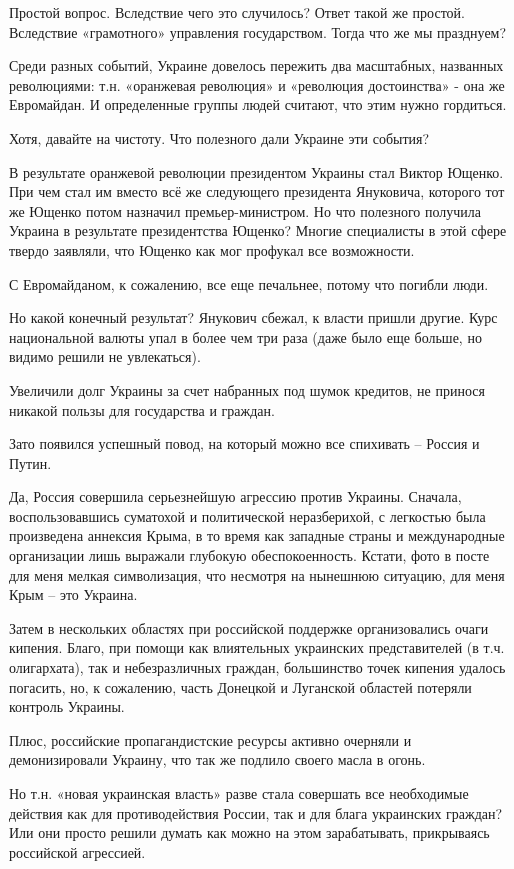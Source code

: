 Простой вопрос. Вследствие чего это случилось? Ответ такой же простой.
Вследствие «грамотного» управления государством. Тогда что же мы празднуем?

Среди разных событий, Украине довелось пережить два масштабных, названных
революциями: т.н. «оранжевая революция» и «революция достоинства» - она же
Евромайдан. И определенные группы людей считают, что этим нужно гордиться.

Хотя, давайте на чистоту. Что полезного дали Украине эти события?

В результате оранжевой революции президентом Украины стал Виктор Ющенко. При
чем стал им вместо всё же следующего президента Януковича, которого тот же
Ющенко потом назначил премьер-министром. Но что полезного получила Украина в
результате президентства Ющенко? Многие специалисты в этой сфере твердо
заявляли, что Ющенко как мог профукал все возможности.

С Евромайданом, к сожалению, все еще печальнее, потому что погибли люди.

Но какой конечный результат? Янукович сбежал, к власти пришли другие. Курс
национальной валюты упал в более чем три раза (даже было еще больше, но видимо
решили не увлекаться).

Увеличили долг Украины за счет набранных под шумок кредитов, не принося никакой пользы для государства и граждан.

Зато появился успешный повод, на который можно все спихивать – Россия и Путин.

Да, Россия совершила серьезнейшую агрессию против Украины. Сначала,
воспользовавшись суматохой и политической неразберихой, с легкостью была
произведена аннексия Крыма, в то время как западные страны и международные
организации лишь выражали глубокую обеспокоенность. Кстати, фото в посте для
меня мелкая символизация, что несмотря на нынешнюю ситуацию, для меня Крым –
это Украина.

Затем в нескольких областях при российской поддержке организовались очаги
кипения. Благо, при помощи как влиятельных украинских представителей (в т.ч.
олигархата), так и небезразличных граждан, большинство точек кипения удалось
погасить, но, к сожалению, часть Донецкой и Луганской областей потеряли
контроль Украины.

Плюс, российские пропагандистские ресурсы активно очерняли и демонизировали
Украину, что так же подлило своего масла в огонь.

Но т.н. «новая украинская власть» разве стала совершать все необходимые
действия как для противодействия России, так и для блага украинских граждан?
Или они просто решили думать как можно на этом зарабатывать, прикрываясь
российской агрессией.

